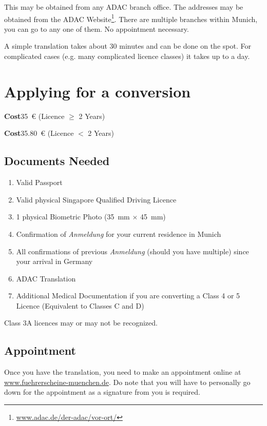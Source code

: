 \documentclass{article}
\newcommand{\de}[1]{\textcolor{NavyBlue}{\textit{#1}}}
\newcommand{\cost}[1]{\textbf{Cost}\hspace{1cm}\SI[round-precision=2,round-mode=places,round-integer-to-decimal]{#1}[]{}~\euro}
\begin{document}
    This may be obtained from any ADAC branch office. The addresses may be obtained from the ADAC Website\footnote{\url{www.adac.de/der-adac/vor-ort/}}. There are multiple branches within Munich, you can go to any one of them. No appointment necessary.
    
    A simple translation takes about 30 minutes and can be done on the spot. For complicated cases (e.g. many complicated licence classes) it takes up to a day.  

\section{Applying for a conversion}
    \cost{35} \hspace{5mm} (Licence $\geq$ 2 Years)\par
    \cost{35.80} \hspace{5mm} (Licence $<$ 2 Years)
    
    \subsection{Documents Needed}
        \begin{enumerate}
            \item Valid Passport
            \item Valid physical Singapore Qualified Driving Licence
            \item 1 physical Biometric Photo (\SI{35}{\milli\meter} $\times$ \SI{45}{\milli\meter})
            \item Confirmation of \de{Anmeldung} for your current residence in Munich
            \item All confirmations of previous \de{Anmeldung} (should you have multiple) since your arrival in Germany
            \item ADAC Translation
            \item Additional Medical Documentation if you are converting a Class 4 or 5 Licence (Equivalent to Classes C and D)
        \end{enumerate}
        
        Class 3A licences may or may not be recognized. 
    
    \subsection{Appointment}
        Once you have the translation, you need to make an appointment online at \url{www.fuehrerscheine-muenchen.de}. Do note that you will have to personally go down for the appointment as a signature from you is required.
        
\end{document}
